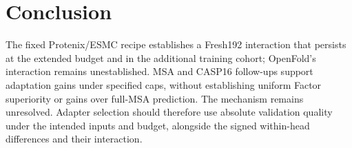 \section{Conclusion}
\label{sec:conclusion}
The fixed Protenix/ESMC recipe establishes a Fresh192 interaction that
persists at the extended budget and in the additional training cohort;
OpenFold's interaction remains unestablished. MSA and CASP16 follow-ups
support adaptation gains under specified caps, without establishing
uniform Factor superiority or gains over full-MSA prediction. The mechanism
remains unresolved. Adapter selection should therefore use absolute
validation quality under the intended inputs and budget, alongside the
signed within-head differences and their interaction.
